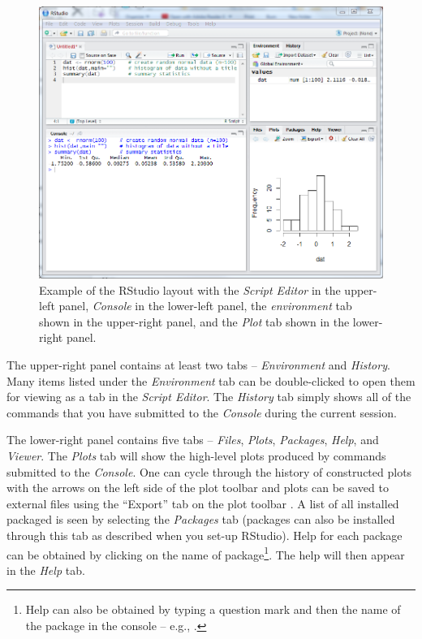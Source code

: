 \documentclass{article}\usepackage[]{graphicx}\usepackage[]{color}
\begin{document}
\begin{figure}[h!]
  \centering
    \includegraphics[width=5.8in]{Figs/RStudio_Intro_Layout.png}
    \caption{Example of the RStudio layout with the \textit{Script Editor} in the upper-left panel, \textit{Console} in the lower-left panel, the \textit{environment} tab shown in the upper-right panel, and the \textit{Plot} tab shown in the lower-right panel.}
  \label{fig:RStudioLayout}
\end{figure}

The upper-right panel contains at least two tabs -- \textit{Environment} and \textit{History}.  Many items listed under the \textit{Environment} tab can be double-clicked to open them for viewing as a tab in the \textit{Script Editor}.  The \textit{History} tab simply shows all of the commands that you have submitted to the \textit{Console} during the current session.

The lower-right panel contains five tabs -- \textit{Files}, \textit{Plots}, \textit{Packages}, \textit{Help}, and \textit{Viewer}.  The \textit{Plots} tab will show the high-level plots produced by commands submitted to the \textit{Console}.  One can cycle through the history of constructed plots with the arrows on the left side of the plot toolbar and plots can be saved to external files using the ``Export'' tab on the plot toolbar .  A list of all installed packaged is seen by selecting the \textit{Packages} tab (packages can also be installed through this tab as described when you set-up RStudio).  Help for each package can be obtained by clicking on the name of package\footnote{Help can also be obtained by typing a question mark and then the name of the package in the console -- e.g., .}.  The help will then appear in the \textit{Help} tab.
\end{document}
